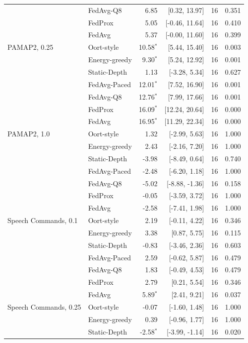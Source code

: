 \begin{tabular}{@{}llrrrr@{}}
 & FedAvg-Q8 & 6.85 & [0.32, 13.97] & 16 & 0.351\\
 & FedProx & 5.05 & [-0.46, 11.64] & 16 & 0.410\\
 & FedAvg & 5.37 & [-0.00, 11.60] & 16 & 0.399\\
\midrule
PAMAP2, 0.25 & Oort-style & 10.58$^{*}$ & [5.44, 15.40] & 16 & 0.003\\
 & Energy-greedy & 9.30$^{*}$ & [5.24, 12.92] & 16 & 0.001\\
 & Static-Depth & 1.13 & [-3.28, 5.34] & 16 & 0.627\\
 & FedAvg-Paced & 12.01$^{*}$ & [7.52, 16.90] & 16 & 0.001\\
 & FedAvg-Q8 & 12.76$^{*}$ & [7.99, 17.66] & 16 & 0.001\\
 & FedProx & 16.09$^{*}$ & [12.24, 20.64] & 16 & 0.000\\
 & FedAvg & 16.95$^{*}$ & [11.29, 22.34] & 16 & 0.000\\
\midrule
PAMAP2, 1.0 & Oort-style & 1.32 & [-2.99, 5.63] & 16 & 1.000\\
 & Energy-greedy & 2.43 & [-2.16, 7.20] & 16 & 1.000\\
 & Static-Depth & -3.98 & [-8.49, 0.64] & 16 & 0.740\\
 & FedAvg-Paced & -2.48 & [-6.20, 1.18] & 16 & 1.000\\
 & FedAvg-Q8 & -5.02 & [-8.88, -1.36] & 16 & 0.158\\
 & FedProx & -0.05 & [-3.59, 3.72] & 16 & 1.000\\
 & FedAvg & -2.58 & [-7.41, 1.98] & 16 & 1.000\\
\midrule
Speech Commands, 0.1 & Oort-style & 2.19 & [-0.11, 4.22] & 16 & 0.346\\
 & Energy-greedy & 3.38 & [0.87, 5.75] & 16 & 0.115\\
 & Static-Depth & -0.83 & [-3.46, 2.36] & 16 & 0.603\\
 & FedAvg-Paced & 2.59 & [-0.62, 5.87] & 16 & 0.479\\
 & FedAvg-Q8 & 1.83 & [-0.49, 4.53] & 16 & 0.479\\
 & FedProx & 2.79 & [0.21, 5.54] & 16 & 0.346\\
 & FedAvg & 5.89$^{*}$ & [2.41, 9.21] & 16 & 0.037\\
\midrule
Speech Commands, 0.25 & Oort-style & -0.07 & [-1.60, 1.48] & 16 & 1.000\\
 & Energy-greedy & 0.39 & [-0.96, 1.77] & 16 & 1.000\\
 & Static-Depth & -2.58$^{*}$ & [-3.99, -1.14] & 16 & 0.020\\

\end{tabular}
